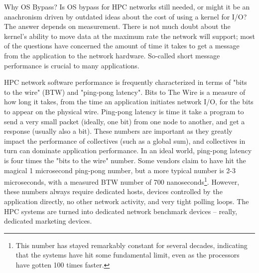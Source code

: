 \documentclass[a4,10pt,preprint]{sigplanconf}
\begin{document}
Why OS Bypass? Is OS bypass for HPC networks still needed, or might it be an anachronism driven
by outdated ideas about the cost of using a kernel for I/O?
The answer depends on measurement. There is not much doubt about the kernel's ability to move
data at the maximum rate the network will support; most of the questions have concerned the amount of 
time it takes to get a message from the application to the network hardware. 
So-called short message performance is crucial to many applications. 

HPC network software performance is frequently characterized in terms of "bits to the wire" (BTW) and "ping-pong latency". 
Bits to The Wire is a measure of how long it takes, 
from the time an application initiates
network I/O, for the bits to appear on the physical wire. Ping-pong latency 
is time it take a program to send a very small packet (ideally, one bit) from 
one node to another, and get a response (usually also a bit). 
These numbers are important as they greatly impact the performance of collectives (such as a global sum), 
and collectives in turn can dominate application performance\cite{petrini}\cite{ 10.1109/HPC.1997.592137}\cite{quadrics}.
In an ideal world, ping-pong latency is four times the "bits to the wire" number. 
Some vendors claim to have hit the magical 1 microsecond ping-pong number, but a more typical 
number is 2-3 microseconds, with a measured BTW number of 700 nanoseconds\footnote{This number has stayed 
remarkably constant for several decades, indicating that the systems have hit some fundamental limit, even as the processors 
have gotten 100 times faster. }.
However, these numbers always require dedicated hosts, devices
controlled by the application directly, no other network activity, 
and very tight polling loops. The HPC systems are turned into dedicated network benchmark devices -- really, dedicated marketing devices. 

\end{document}

